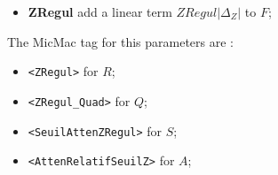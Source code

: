 \begin{itemize}
   \item {\bf ZRegul} add a linear term $ZRegul |\Delta_Z| $ to $F$;
\end{itemize}


The MicMac tag for this parameters are :

\begin{itemize}
   \item {\tt <ZRegul>}  for $R$;
   \item {\tt <ZRegul\_Quad>}  for $Q$;
   \item {\tt <SeuilAttenZRegul>}  for $S$;
   \item {\tt <AttenRelatifSeuilZ>}  for $A$;
\end{itemize}






